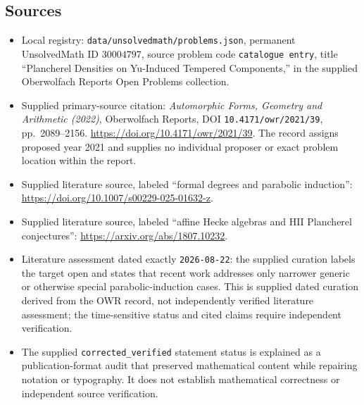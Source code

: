 \documentclass[11pt]{article}
\begin{document}
\subsection{Sources}
\begin{itemize}
\item Local registry: \texttt{data/unsolvedmath/problems.json}, permanent UnsolvedMath ID \(30004797\), source problem code \texttt{catalogue entry}, title ``Plancherel Densities on Yu-Induced Tempered Components,'' in the supplied Oberwolfach Reports Open Problems collection.
\item Supplied primary-source citation: \emph{Automorphic Forms, Geometry and Arithmetic (2022)}, Oberwolfach Reports, DOI \texttt{10.4171/owr/2021/39}, pp.\ 2089--2156. \url{https://doi.org/10.4171/owr/2021/39}. The record assigns proposed year 2021 and supplies no individual proposer or exact problem location within the report.
\item Supplied literature source, labeled ``formal degrees and parabolic induction'': \url{https://doi.org/10.1007/s00229-025-01632-z}.
\item Supplied literature source, labeled ``affine Hecke algebras and HII Plancherel conjectures'': \url{https://arxiv.org/abs/1807.10232}.
\item Literature assessment dated exactly \texttt{2026-08-22}: the supplied curation labels the target open and states that recent work addresses only narrower generic or otherwise special parabolic-induction cases. This is supplied dated curation derived from the OWR record, not independently verified literature assessment; the time-sensitive status and cited claims require independent verification.
\item The supplied \texttt{corrected\_verified} statement status is explained as a publication-format audit that preserved mathematical content while repairing notation or typography. It does not establish mathematical correctness or independent source verification.
\end{itemize}
\end{document}

